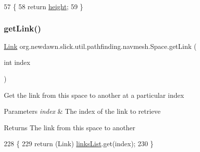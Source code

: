 \begin{DoxyCode}
57                              \{
58         \textcolor{keywordflow}{return} \mbox{\hyperlink{classorg_1_1newdawn_1_1slick_1_1util_1_1pathfinding_1_1navmesh_1_1_space_a2214b5226eed20766ff61fc3f9803a58}{height}};
59     \}
\end{DoxyCode}
\mbox{\label{classorg_1_1newdawn_1_1slick_1_1util_1_1pathfinding_1_1navmesh_1_1_space_a4e59fd2383be245f7188a62b01e602ab}} 
\subsubsection{\texorpdfstring{get\+Link()}{getLink()}}
{\footnotesize\ttfamily \mbox{\hyperlink{classorg_1_1newdawn_1_1slick_1_1util_1_1pathfinding_1_1navmesh_1_1_link}{Link}} org.\+newdawn.\+slick.\+util.\+pathfinding.\+navmesh.\+Space.\+get\+Link (\begin{DoxyParamCaption}\item[{int}]{index }\end{DoxyParamCaption})\hspace{0.3cm}{\ttfamily [inline]}}

Get the link from this space to another at a particular index


\begin{DoxyParams}{Parameters}
{\em index} & The index of the link to retrieve \\
\hline
\end{DoxyParams}
\begin{DoxyReturn}{Returns}
The link from this space to another 
\end{DoxyReturn}

\begin{DoxyCode}
228                                    \{
229         \textcolor{keywordflow}{return} (Link) \mbox{\hyperlink{classorg_1_1newdawn_1_1slick_1_1util_1_1pathfinding_1_1navmesh_1_1_space_ab8ed6f02eb154ea33c907a3dda0b92db}{linksList}}.get(index);
230     \}
\end{DoxyCode}
\mbox{\label{classorg_1_1newdawn_1_1slick_1_1util_1_1pathfinding_1_1navmesh_1_1_space_acbf12c4dedd1bd281287e4c195bf3a88}} 
